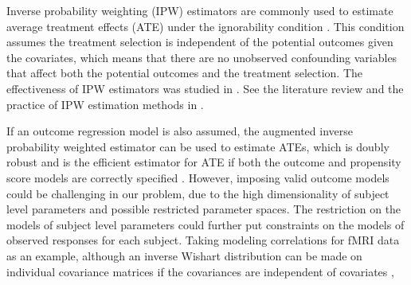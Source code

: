 \documentclass[12pt]{article}
\theoremstyle{definition}
\begin{document}
Inverse probability weighting (IPW) estimators are commonly used to estimate average treatment effects (ATE) under the ignorability condition \citep{rosenbaum1983}.
This condition assumes the treatment selection is independent of the potential outcomes given the covariates, which means that there are no unobserved confounding variables that affect both the potential outcomes and the treatment selection. 
The effectiveness of IPW estimators 
was studied in \cite{hirano2003}. 
See the literature review and the practice of IPW estimation methods in \cite{austin2015moving, ImbensRubin2015}.

If an outcome regression model is also assumed, the augmented inverse probability weighted estimator \citep{bang2005doubly, funk2011doubly} can be used to estimate ATEs, which is doubly robust and is the efficient estimator for ATE if both the outcome and propensity score models are correctly specified \citep{cao2009improving}. 
However, imposing valid outcome models could be challenging in our problem, due to the high dimensionality of subject level parameters and possible restricted parameter spaces.
The restriction on the models of subject level parameters could further put constraints on the models of observed responses for each subject.
Taking modeling correlations for fMRI data as an example, although an inverse Wishart distribution can be made on individual covariance matrices if the covariances are independent of covariates \citep{marrelec2006partial},
\end{document}
